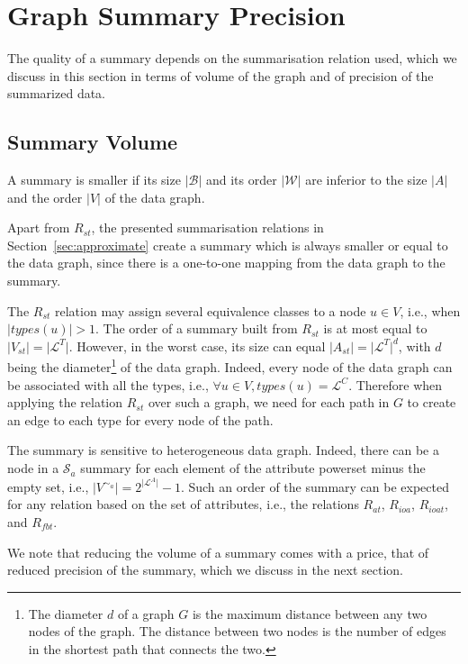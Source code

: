 \section{Graph Summary Precision}
\label{chap03:sec:quality}

The quality of a summary depends on the summarisation relation used, which we discuss in this section in terms of volume of the graph and of precision of the summarized data.

\subsection{Summary Volume}

A summary is smaller if its size $\vert \mathcal{B} \vert$ and its order $\vert \mathcal{W} \vert$ are inferior to the size $\vert A \vert$ and the order $\vert V \vert$ of the data graph.

Apart from $R_{st}$, the presented summarisation relations in Section~\ref{sec:approximate} create a summary which is always smaller or equal to the data graph, since there is a one-to-one mapping from the data graph to the summary.

The $R_{st}$ relation may assign several equivalence classes to a node $u \in V$, i.e., when $\vert types(u) \vert > 1$. The order of a summary built from $R_{st}$ is at most equal to $\vert V_{st} \vert = \vert \mathcal{L}^T \vert$. However, in the worst case, its size can equal $\vert A_{st} \vert = \vert \mathcal{L}^T \vert ^d$, with $d$ being the diameter\footnote{The diameter $d$ of a graph $G$ is the maximum distance between any two nodes of the graph. The distance between two nodes is the number of edges in the shortest path that connects the two.} of the data graph. Indeed, every node of the data graph can be associated with all the types, i.e., $\forall u \in V, types(u) = \mathcal{L}^C$. Therefore when applying the relation $R_{st}$ over such a graph, we need for each path in $G$ to create an edge to each type for every node of the path.

The summary is sensitive to heterogeneous data graph. Indeed, there can be a node in a $\mathcal{S}_a$ summary for each element of the attribute powerset minus the empty set, i.e., $\vert V^{\sim_a} \vert = 2^{\vert \mathcal{L}^A \vert} - 1$. Such an order of the summary can be expected for any relation based on the set of attributes, i.e., the relations $R_{at}$, $R_{ioa}$, $R_{ioat}$, and $R_{fbt}$.

We note that reducing the volume of a summary comes with a price, that of reduced precision of the summary, which we discuss in the next section.

